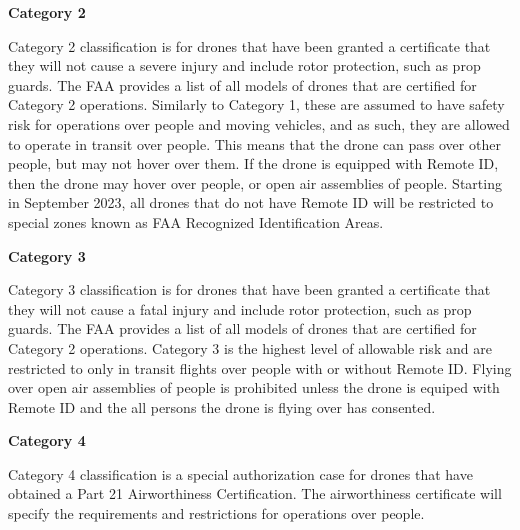 \documentclass[
  12pt,
]{book}
\begin{document}
\textbf{Category 2}

Category 2 classification is for drones that have been granted a certificate that they will not cause a severe injury and include rotor protection, such as prop guards. The FAA provides a list of all models of drones that are certified for Category 2 operations. Similarly to Category 1, these are assumed to have safety risk for operations over people and moving vehicles, and as such, they are allowed to operate in transit over people. This means that the drone can pass over other people, but may not hover over them. If the drone is equipped with Remote ID, then the drone may hover over people, or open air assemblies of people. Starting in September 2023, all drones that do not have Remote ID will be restricted to special zones known as FAA Recognized Identification Areas.

\textbf{Category 3}

Category 3 classification is for drones that have been granted a certificate that they will not cause a fatal injury and include rotor protection, such as prop guards. The FAA provides a list of all models of drones that are certified for Category 2 operations. Category 3 is the highest level of allowable risk and are restricted to only in transit flights over people with or without Remote ID. Flying over open air assemblies of people is prohibited unless the drone is equiped with Remote ID and the all persons the drone is flying over has consented.

\textbf{Category 4}

Category 4 classification is a special authorization case for drones that have obtained a Part 21 Airworthiness Certification. The airworthiness certificate will specify the requirements and restrictions for operations over people.
\end{document}
